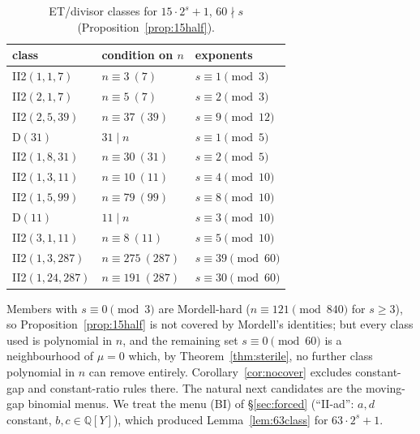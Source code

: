 \documentclass[11pt,reqno]{amsart}
\theoremstyle{definition}
\newcommand{\Q}{\mathbb Q}
\begin{document}
\begin{table}[ht]
\centering\small
\begin{tabular}{lll}
\toprule
class & condition on $n$ & exponents\\
\midrule
II2$(1,1,7)$ & $n\equiv3\ (7)$ & $s\equiv 1\pmod{3}$ \\
II2$(2,1,7)$ & $n\equiv5\ (7)$ & $s\equiv 2\pmod{3}$ \\
II2$(2,5,39)$ & $n\equiv37\ (39)$ & $s\equiv 9\pmod{12}$ \\
D$(31)$ & $31\mid n$ & $s\equiv 1\pmod{5}$ \\
II2$(1,8,31)$ & $n\equiv30\ (31)$ & $s\equiv 2\pmod{5}$ \\
II2$(1,3,11)$ & $n\equiv10\ (11)$ & $s\equiv 4\pmod{10}$ \\
II2$(1,5,99)$ & $n\equiv79\ (99)$ & $s\equiv 8\pmod{10}$ \\
D$(11)$ & $11\mid n$ & $s\equiv 3\pmod{10}$ \\
II2$(3,1,11)$ & $n\equiv8\ (11)$ & $s\equiv 5\pmod{10}$ \\
II2$(1,3,287)$ & $n\equiv275\ (287)$ & $s\equiv 39\pmod{60}$ \\
II2$(1,24,287)$ & $n\equiv191\ (287)$ & $s\equiv 30\pmod{60}$ \\
\bottomrule
\end{tabular}
\caption{ET/divisor classes for $15\cdot2^s+1$, $60\nmid s$
(Proposition~\ref{prop:15half}).}\label{tab:15}
\end{table}

Members with $s\equiv0\pmod3$ are Mordell-hard ($n\equiv121\pmod{840}$ for
$s\ge3$), so Proposition~\ref{prop:15half} is not covered by Mordell's
identities; but every class used is polynomial in $n$, and the remaining
set $s\equiv0\pmod{60}$ is a neighbourhood of $\mu=0$ which, by
Theorem~\ref{thm:sterile}, no further class polynomial in $n$ can remove
entirely.  Corollary~\ref{cor:nocover} excludes constant-gap and
constant-ratio rules there.  The natural next candidates are the
moving-gap binomial menus.  We treat the menu (BI) of \S\ref{sec:forced}
(``II-ad'': $a,d$ constant, $b,c\in\Q[Y]$), which produced
Lemma~\ref{lem:63class} for $63\cdot2^s+1$.
\end{document}
